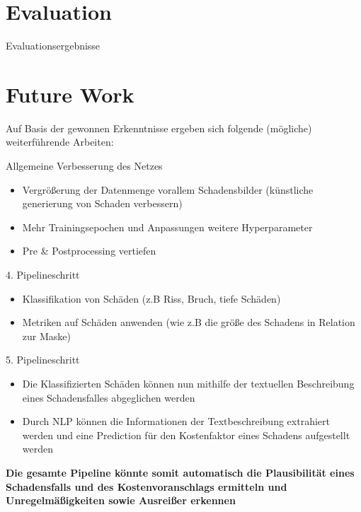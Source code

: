 \documentclass[9pt]{beamer}
\begin{document}
\section{Evaluation}  

\begin{frame}{Evaluationsergebnisse}

\end{frame}

\section{Future Work}  
\begin{frame}
Auf Basis der gewonnen Erkenntnisse ergeben sich folgende (mögliche) weiterführende Arbeiten:
\begin{block}{Allgemeine Verbesserung des Netzes}
	\begin{itemize}
		\item Vergrößerung der Datenmenge vorallem Schadensbilder (künstliche generierung von Schaden verbessern)
		\item Mehr Trainingsepochen und Anpassungen weitere Hyperparameter
		\item Pre \& Postprocessing vertiefen
	\end{itemize}
\end{block}
\begin{block}{4. Pipelineschritt}
	\begin{itemize}
		\item Klassifikation von Schäden (z.B Riss, Bruch, tiefe Schäden) 
		\item Metriken auf Schäden anwenden (wie z.B die größe des Schadens in Relation zur Maske)
	\end{itemize}
\end{block}
\end{frame}

\begin{frame}
\begin{block}{5. Pipelineschritt}
	\begin{itemize}
		\item Die Klassifizierten Schäden können nun mithilfe der textuellen Beschreibung eines Schadensfalles abgeglichen werden  
		\item Durch NLP können die Informationen der Textbeschreibung extrahiert werden und eine Prediction für den Kostenfaktor eines Schadens aufgestellt werden
	\end{itemize}
\end{block}
\textbf{Die gesamte Pipeline könnte somit automatisch die Plausibilität eines Schadensfalls und des Kostenvoranschlags ermitteln und Unregelmäßigkeiten sowie Ausreißer erkennen}
\end{frame}
\end{document}
